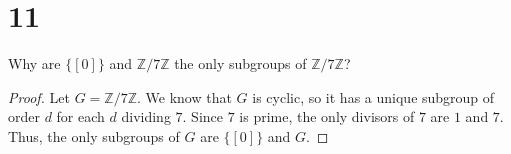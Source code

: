 \documentclass{article}
\begin{document}

\newpage


\section*{11}
Why are $\{[0]\}$ and $\mathbb{Z}/7\mathbb{Z}$ the only subgroups of $\mathbb{Z}/7\mathbb{Z}$?
\begin{proof}
    Let $G = \mathbb{Z}/7\mathbb{Z}$. We know that $G$ is cyclic, so it has a unique subgroup of order $d$ for each $d$ dividing $7$. Since $7$ is prime, the only divisors of $7$ are $1$ and $7$. Thus, the only subgroups of $G$ are $\{[0]\}$ and $G$.
\end{proof}
\end{document}
